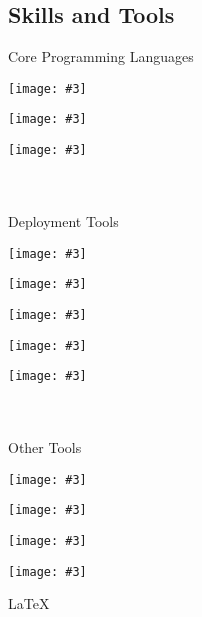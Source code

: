 \documentclass[a4paper, 10pt]{article}
\newcommand{\IconSize}{0.15}
\newcommand{\Icon}[3]{
    \begin{minipage}[c]{#1\textwidth}
        \vspace*{4pt}
        \texttt{[image: \#3]}
    \end{minipage}
}
\begin{document}
\begin{tcbraster}[raster columns=7]
\begin{tcolorbox}[left=1cm, height=1.0\textheight, colback=white, raster multicolumn=5, boxrule=0pt, frame empty, nobeforeafter]
    \section*{Skills and Tools}
    \begin{tcbraster}[raster columns=2]
        \begin{tcolorbox}[colback=white, boxrule=0pt, frame empty, nobeforeafter]
            {\color{textgray} Core Programming Languages }\\
            \Icon{\IconSize}{1.3}{./src/rust.pdf}
            \Icon{\IconSize}{1.15}{./src/cpp.pdf}
            \Icon{\IconSize}{1.1}{./src/python.pdf}
            \\\\
            {\color{textgray} Deployment Tools }\\
            \Icon{\IconSize}{1.1}{./src/cmake.pdf}
            \Icon{\IconSize}{1.1}{./src/conan.pdf}
            \Icon{\IconSize}{1.3}{./src/docker.pdf}
            \Icon{\IconSize}{1.05}{./src/jenkins.pdf}
            \Icon{\IconSize}{1.1}{./src/artifactory.pdf}
            \\\\
            {\color{textgray} Other Tools }\\
            \Icon{\IconSize}{1.0}{./src/neovim.pdf}
            \hspace*{-6pt}
            \Icon{\IconSize}{1.25}{./src/github.pdf}
            \Icon{\IconSize}{1.1}{./src/javascript.pdf}
            \Icon{\IconSize}{1.1}{./src/webassembly.pdf}
            \begin{minipage}[c]{\IconSize\textwidth}
                \vspace*{4pt}
                \hspace*{-3.5pt}
                \LARGE \LaTeX
            \end{minipage}
        \end{tcolorbox}
    \end{tcbraster}
\end{tcolorbox}
\end{tcbraster}
\end{document}
